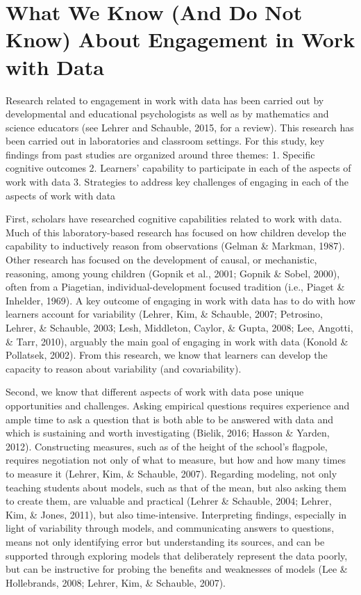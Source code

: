 \documentclass[]{book}
\theoremstyle{definition}
\theoremstyle{definition}
\theoremstyle{definition}
\theoremstyle{remark}
\begin{document}
\section{What We Know (And Do Not Know) About Engagement in Work with
Data}\label{what-we-know-and-do-not-know-about-engagement-in-work-with-data}

Research related to engagement in work with data has been carried out by
developmental and educational psychologists as well as by mathematics
and science educators (see Lehrer and Schauble, 2015, for a review).
This research has been carried out in laboratories and classroom
settings. For this study, key findings from past studies are organized
around three themes: 1. Specific cognitive outcomes 2. Learners'
capability to participate in each of the aspects of work with data 3.
Strategies to address key challenges of engaging in each of the aspects
of work with data

First, scholars have researched cognitive capabilities related to work
with data. Much of this laboratory-based research has focused on how
children develop the capability to inductively reason from observations
(Gelman \& Markman, 1987). Other research has focused on the development
of causal, or mechanistic, reasoning, among young children (Gopnik et
al., 2001; Gopnik \& Sobel, 2000), often from a Piagetian,
individual-development focused tradition (i.e., Piaget \& Inhelder,
1969). A key outcome of engaging in work with data has to do with how
learners account for variability (Lehrer, Kim, \& Schauble, 2007;
Petrosino, Lehrer, \& Schauble, 2003; Lesh, Middleton, Caylor, \& Gupta,
2008; Lee, Angotti, \& Tarr, 2010), arguably the main goal of engaging
in work with data (Konold \& Pollatsek, 2002). From this research, we
know that learners can develop the capacity to reason about variability
(and covariability).

Second, we know that different aspects of work with data pose unique
opportunities and challenges. Asking empirical questions requires
experience and ample time to ask a question that is both able to be
answered with data and which is sustaining and worth investigating
(Bielik, 2016; Hasson \& Yarden, 2012). Constructing measures, such as
of the height of the school's flagpole, requires negotiation not only of
what to measure, but how and how many times to measure it (Lehrer, Kim,
\& Schauble, 2007). Regarding modeling, not only teaching students about
models, such as that of the mean, but also asking them to create them,
are valuable and practical (Lehrer \& Schauble, 2004; Lehrer, Kim, \&
Jones, 2011), but also time-intensive. Interpreting findings, especially
in light of variability through models, and communicating answers to
questions, means not only identifying error but understanding its
sources, and can be supported through exploring models that deliberately
represent the data poorly, but can be instructive for probing the
benefits and weaknesses of models (Lee \& Hollebrands, 2008; Lehrer,
Kim, \& Schauble, 2007).
\end{document}
